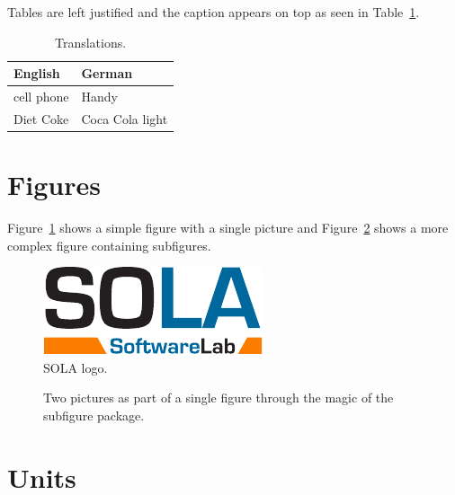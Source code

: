 \documentclass[11pt,a4paper]{book}
\begin{document}
Tables are left justified and the caption appears on top as seen in
Table~\ref{t:Translations}.

\begin{table}[ht]
\centering
\begin{tabular}{ll}
\hline
\textbf{English} & \textbf{German}\\
\hline
cell phone       & Handy\\
Diet Coke        & Coca Cola light\\
\hline
\end{tabular}
\caption[Translations]{\label{t:Translations}Translations.}
\end{table}

\section{Figures}

Figure~\ref{f:SOLAlogo} shows a simple figure with a single picture
and Figure~\ref{f:SubfigureExample} shows a more complex figure
containing subfigures.

\begin{figure}[ht]
\centering
\includegraphics[width=.6\linewidth]{figures/SOLALogo}
\caption[SOLA logo]{\label{f:SOLAlogo}SOLA logo.}
\end{figure}

\begin{figure}[ht]
\centering
{}\quad
{}
\caption[Subfigure example]{\label{f:SubfigureExample}Two pictures as
  part of a single figure through the magic of the subfigure package.}
\end{figure}

\section{Units}
\end{document}
